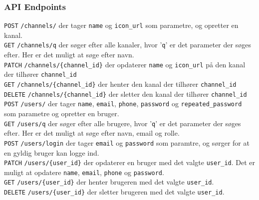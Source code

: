 \subsubsection{API Endpoints}
\texttt{POST} \texttt{/channels/} der tager \texttt{name} og \texttt{icon\_url} som parametre, og opretter en kanal.\\


\texttt{GET} \texttt{/channels/q} der søger efter alle kanaler, hvor '\texttt{q}' er det parameter der søges efter. Her er det muligt at søge efter navn.\\


\texttt{PATCH} \texttt{/channels/\{channel\_id\}} der opdaterer \texttt{name} og \texttt{icon\_url} på den kanal der tilhører \texttt{channel\_id}\\


\texttt{GET} \texttt{/channels/\{channel\_id\}} der henter den kanal der tilhører \texttt{channel\_id}\\


\texttt{DELETE} \texttt{/channels/\{channel\_id\}} der sletter den kanal der tilhører \texttt{channel\_id}\\


\texttt{POST} \texttt{/users/} der tager \texttt{name}, \texttt{email}, \texttt{phone}, \texttt{password} og \texttt{repeated\_password} som parametre og opretter en bruger.\\


\texttt{GET} \texttt{/users/q} der søger efter alle brugere, hvor '\texttt{q}' er det parameter der søges efter. Her er det muligt at søge efter navn, email og rolle.\\


\texttt{POST} \texttt{/users/login} der tager \texttt{email} og \texttt{password} som paramtre, og sørger for at en gyldig bruger kan logge ind.\\


\texttt{PATCH} \texttt{/users/\{user\_id\}} der opdaterer en bruger med det valgte \texttt{user\_id}. Det er muligt at opdatere \texttt{name}, \texttt{email}, \texttt{phone} og \texttt{password}.\\


\texttt{GET} \texttt{/users/\{user\_id\}} der henter brugeren med det valgte \texttt{user\_id}.\\


\texttt{DELETE} \texttt{/users/\{user\_id\}} der sletter brugeren med det valgte \texttt{user\_id}.\\


